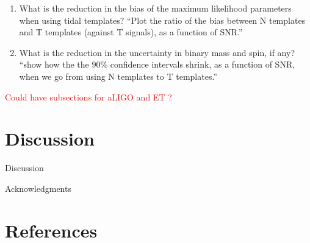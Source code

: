\documentclass[aps,prd,amsmath,floats,floatfix, twocolumn,
superscriptaddress,nofootinbib,showpacs]{revtex4-1}
\newcommand{\red}{\textcolor{red}}
\begin{document}
\begin{enumerate}
\item What is the reduction in the bias of the maximum likelihood parameters
when using tidal templates?\newline
``Plot the ratio of the bias between N templates and T templates (against T
signals), as a function of SNR.''
\item What is the reduction in the uncertainty in binary mass and spin, if
any?\newline
``show how the the $90\%$ confidence intervals shrink, as a function of SNR, 
when we go from using N templates to T templates.''
\end{enumerate}


\red{Could have subsections for aLIGO and ET ?}


\section{Discussion}
Discussion

\begin{acknowledgments}
Acknowledgments
\end{acknowledgments}

\section*{References}

\end{document}
